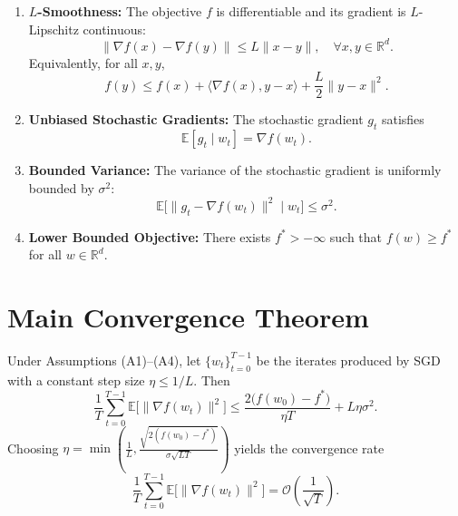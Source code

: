\documentclass{article}
\begin{document}
\begin{enumerate}
    \item \textbf{$L$-Smoothness:} The objective $f$ is differentiable and its gradient is $L$-Lipschitz continuous:
    \begin{equation}
        \|\nabla f(x) - \nabla f(y)\| \le L \|x - y\|, \quad \forall x,y \in \mathbb{R}^d.
    \end{equation}
    Equivalently, for all $x,y$,
    \begin{equation}
        f(y) \le f(x) + \langle \nabla f(x), y-x \rangle + \frac{L}{2} \|y-x\|^2. \tag{A1}
    \end{equation}
    \item \textbf{Unbiased Stochastic Gradients:} The stochastic gradient $g_t$ satisfies
    \begin{equation}
        \mathbb{E}[g_t \mid w_t] = \nabla f(w_t). \tag{A2}
    \end{equation}
    \item \textbf{Bounded Variance:} The variance of the stochastic gradient is uniformly bounded by $\sigma^2$:
    \begin{equation}
        \mathbb{E}\bigl[ \|g_t - \nabla f(w_t)\|^2 \mid w_t \bigr] \le \sigma^2. \tag{A3}
    \end{equation}
    \item \textbf{Lower Bounded Objective:} There exists $f^* > -\infty$ such that $f(w) \ge f^*$ for all $w \in \mathbb{R}^d$. 
\end{enumerate}

\section*{Main Convergence Theorem}
\begin{theorem}
Under Assumptions (A1)--(A4), let $\{w_t\}_{t=0}^{T-1}$ be the iterates produced by SGD with a constant step size $\eta \le 1/L$. Then
\begin{equation}
    \frac{1}{T} \sum_{t=0}^{T-1} \mathbb{E}\bigl[ \|\nabla f(w_t)\|^2 \bigr]
    \le \frac{2\bigl(f(w_0) - f^*\bigr)}{\eta T} + L \eta \sigma^2.
\end{equation}
Choosing $\eta = \min\!\left(\frac{1}{L}, \frac{\sqrt{2(f(w_0)-f^*)}}{\sigma\sqrt{L T}}\right)$ yields the convergence rate
\begin{equation}
    \frac{1}{T} \sum_{t=0}^{T-1} \mathbb{E}\bigl[ \|\nabla f(w_t)\|^2 \bigr]
    = \mathcal{O}\!\left( \frac{1}{\sqrt{T}} \right).
\end{equation}
\end{theorem}
\end{document}

